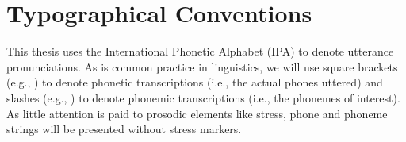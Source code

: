 \renewcommand\contentsname{Table of Contents}
\tableofcontents
\cleardoublepage
{}

\listoftables
\cleardoublepage
{}

\listoffigures
\cleardoublepage
{}


\chapter*{Typographical Conventions}
\label{typography}

This thesis uses the International Phonetic Alphabet (IPA)
to denote utterance pronunciations.
As is common practice in linguistics,
we will use square brackets (e.g., \ipa{[$\cdot$]})
to denote phonetic transcriptions
(i.e., the actual phones uttered)
and slashes (e.g., \ipa{/$\cdot$/})
to denote phonemic transcriptions
(i.e., the phonemes of interest).
As little attention is paid to prosodic elements like stress,
phone and phoneme strings will be presented
without stress markers.

\cleardoublepage
{}


